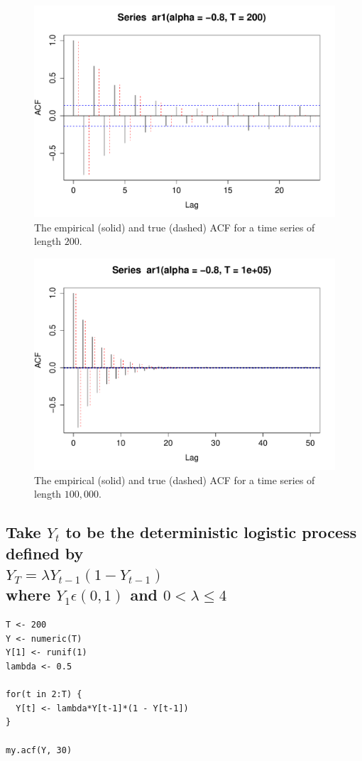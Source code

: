 \documentclass[10pt,a4paper]{article}
\let\Oldsubsection\subsection
\renewcommand{\subsection}{\FloatBarrier\Oldsubsection}
\begin{document}
\begin{figure}[h!]
\includegraphics[width=\linewidth]{plots/p5_empacf.pdf}
\caption{The empirical (solid) and true (dashed) ACF for a time series of length $200$.}
\end{figure}
\begin{figure}[h!]
\includegraphics[width=\linewidth]{plots/p5_trueacf.pdf}
\caption{The empirical (solid) and true (dashed) ACF for a time series of length $100,000$.}
\end{figure}



\subsection{Take $Y_t$ to be the deterministic logistic process defined by \\
$Y_T = \lambda Y_{t-1}(1 - Y_{t-1})$ \\
where $Y_1 \epsilon (0, 1)$ and $0 < \lambda \leq 4$ \\
}
\begin{lstlisting}
T <- 200
Y <- numeric(T)
Y[1] <- runif(1)
lambda <- 0.5

for(t in 2:T) {
  Y[t] <- lambda*Y[t-1]*(1 - Y[t-1])
}

my.acf(Y, 30)
\end{lstlisting}
\end{document}
